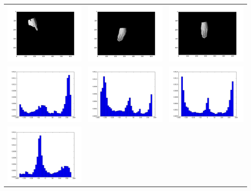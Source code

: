 \begin{tabular}{lll}
\includegraphics[width=4cm]{fig8/gray_550.png} &
\includegraphics[width=4cm]{fig8/gray_341.png} &
\includegraphics[width=4cm]{fig8/gray_318.png} \\
\includegraphics[width=4cm]{fig8/figure_550.png} &
\includegraphics[width=4cm]{fig8/hist_341.png} &
\includegraphics[width=4cm]{fig8/hist_318.png} \\
\includegraphics[width=4cm]{fig8/figure_550_t.png} &

\end{tabular}

